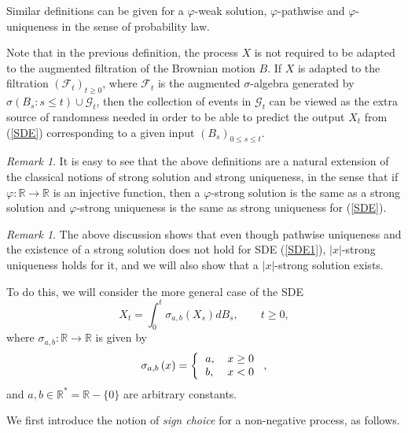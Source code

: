 \documentclass[reqno]{amsart}
\theoremstyle{definition}
\theoremstyle{remark}
\newtheorem{remark}[theorem]{Remark}
\numberwithin{equation}{section}
\begin{document}
Similar definitions can be given for a $\varphi$-weak solution, $\varphi $-pathwise and $\varphi $-uniqueness in the sense of probability law.

Note that in the previous definition, the process $X$ is not required to
be adapted to the augmented filtration of the Brownian motion $B$. If
$X$ is adapted to the filtration $\left(\mathcal{F}_t\right)_{t\ge 0}$, where $\mathcal{F}_t$ is the augmented $\sigma $-algebra genera\-ted by $\sigma \left( B_{s}:s\leq t\right) \cup \mathcal{G}_{t}$, then the collection of events in $\mathcal{G}_{t}$ can be viewed as the extra source of randomness
needed in order to be able to predict the output $X_t$ from (\ref{SDE}) corresponding to a given input $\left(B_s\right)_{0\le s \le t}$.

\begin{remark}
It is easy to see that the above definitions are a natural extension of the
classical notions of strong solution and strong uniqueness, in the sense that
if $\varphi :\mathbb{R\rightarrow R}$ is an injective function,
then a $\varphi $-strong solution is the same as a strong solution and $\varphi $-strong uniqueness is the same as strong uniqueness for (\ref{SDE}).
\end{remark}

\begin{remark}
The above discussion shows that even though pathwise uniqueness and the
existence of a strong solution does not hold for SDE (\ref{SDE1}), $\left\vert
x\right\vert $-strong uniqueness holds for it, and we will also show that a $\left\vert x\right\vert $-strong solution exists.
\end{remark}

To do this, we will consider the more general case of the SDE\begin{equation}
X_{t}=\int_{0}^{t}\sigma _{a,b}\left( X_{s}\right) dB_{s},\qquad t\geq 0,
\label{SDE2}
\end{equation}where $\sigma _{a,b}:\mathbb{R\rightarrow R}$ is given by\begin{equation}
\sigma _{a,b}\left( x\right) =\left\{
\begin{tabular}{ll}
$a,$ & $x\geq 0$ \\
$b,$ & $x<0$\end{tabular}\right. ,  \label{sigma_a,b}
\end{equation}and $a,b\in \mathbb{R}^{\ast }=\mathbb{R}-\{0\}$ are arbitrary constants.

We first introduce the notion of \emph{sign choice} for a non-negative
process, as follows.
\end{document}
